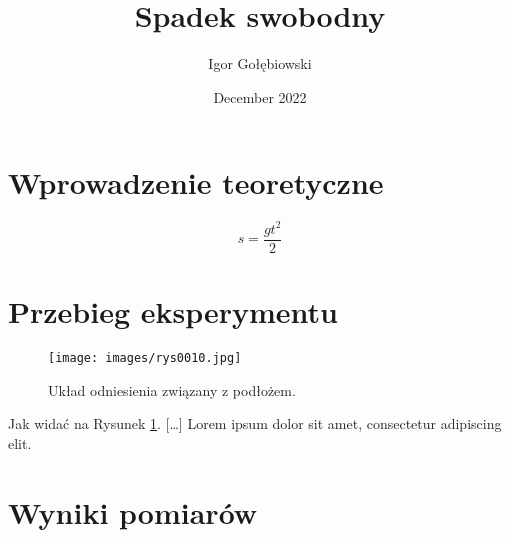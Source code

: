 \documentclass{article}
\title{Spadek swobodny}
\author{Igor Gołębiowski}
\date{December 2022}
\begin{document}
\maketitle

\section{Wprowadzenie teoretyczne}

\begin {equation}
s=\frac{gt^2}{2}
\end {equation}

\section{Przebieg eksperymentu}

\begin{figure}[h]

    \centering
    \texttt{[image: images/rys0010.jpg]}
    \caption{Układ odniesienia związany z podłożem.}
    \label{fig:rysunek1}

\end{figure}

    Jak widać na Rysunek \ref{fig:rysunek1}. […] Lorem ipsum dolor sit amet, consectetur adipiscing elit.

    \newpage
    
\section{Wyniki pomiarów}
\end{document}
